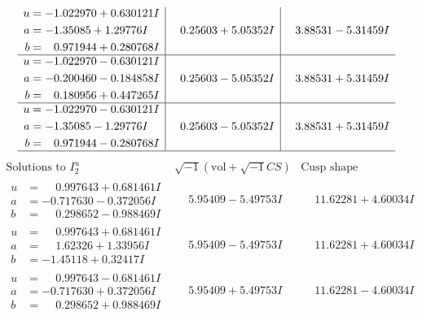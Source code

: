 \documentclass[1p]{elsarticle_modified}
\theoremstyle{definition}
\newcommand{\I}{\sqrt{-1}}
\begin{document}
$$\begin{array}{c|c|c}
\begin{aligned}
u &= -1.022970 + 0.630121 I \\
a &= -1.35085 + 1.29776 I \\
b &= \phantom{-}0.971944 + 0.280768 I\end{aligned}
 & \phantom{-}0.25603 + 5.05352 I & \phantom{-}3.88531 - 5.31459 I \\ \hline\begin{aligned}
u &= -1.022970 - 0.630121 I \\
a &= -0.200460 - 0.184858 I \\
b &= \phantom{-}0.180956 + 0.447265 I\end{aligned}
 & \phantom{-}0.25603 - 5.05352 I & \phantom{-}3.88531 + 5.31459 I \\ \hline\begin{aligned}
u &= -1.022970 - 0.630121 I \\
a &= -1.35085 - 1.29776 I \\
b &= \phantom{-}0.971944 - 0.280768 I\end{aligned}
 & \phantom{-}0.25603 - 5.05352 I & \phantom{-}3.88531 + 5.31459 I\\
 \hline 
 \end{array}$$\newpage$$\begin{array}{c|c|c}  
\text{Solutions to }I^u_{2}& \I (\text{vol} + \sqrt{-1}CS) & \text{Cusp shape}\\
 \hline 
\begin{aligned}
u &= \phantom{-}0.997643 + 0.681461 I \\
a &= -0.717630 - 0.372056 I \\
b &= \phantom{-}0.298652 - 0.988469 I\end{aligned}
 & \phantom{-}5.95409 - 5.49753 I & \phantom{-}11.62281 + 4.60034 I \\ \hline\begin{aligned}
u &= \phantom{-}0.997643 + 0.681461 I \\
a &= \phantom{-}1.62326 + 1.33956 I \\
b &= -1.45118 + 0.32417 I\end{aligned}
 & \phantom{-}5.95409 - 5.49753 I & \phantom{-}11.62281 + 4.60034 I \\ \hline\begin{aligned}
u &= \phantom{-}0.997643 - 0.681461 I \\
a &= -0.717630 + 0.372056 I \\
b &= \phantom{-}0.298652 + 0.988469 I\end{aligned}
 & \phantom{-}5.95409 + 5.49753 I & \phantom{-}11.62281 - 4.60034 I \\ \hline\begin{aligned}

\end{aligned}
\end{array}$$
\end{document}
